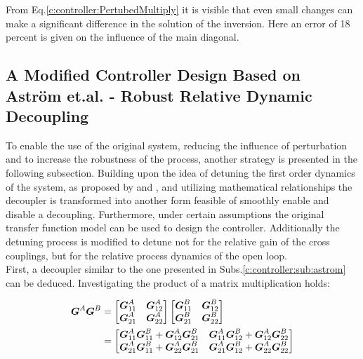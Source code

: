 From Eq.\ref{c:controller:PertubedMultiply} it is visible that even small changes can make a significant difference in the solution of the inversion. Here an error of 18 percent is given on the influence of the main diagonal.\\



\subsection{A Modified Controller Design Based on Astr\"om et.al. - Robust Relative Dynamic Decoupling}
\label{c:controller:sub:modified}

To enable the use of the original system, reducing the influence of perturbation and to increase the robustness of the process, another strategy is presented in the following subsection. Building upon the idea of detuning the first order dynamics of the system, as proposed by \cite{Astrom2001a} and \cite{Astrom2006}, and utilizing mathematical relationships the decoupler is transformed into another form feasible of smoothly enable and disable a decoupling. Furthermore, under certain assumptions the original transfer function model can be used to design the controller. Additionally the detuning process is modified to detune not for the relative gain of the cross couplings, but for the relative process dynamics of the open loop.\\

First, a decoupler similar to the one presented in Subs.\ref{c:controller:sub:astrom} can be deduced. Investigating the product of a matrix multiplication holds: 

\begin{align}
\begin{split}
\mbox{\boldmath$G$}^{A} \mbox{\boldmath$G$}^{B} &= 
\begin{bmatrix}
\mbox{\boldmath$G$}_{11}^{A} & \mbox{\boldmath$G$}_{12}^{A} \\
\mbox{\boldmath$G$}_{21}^{A} & \mbox{\boldmath$G$}_{22}^{A} 
\end{bmatrix}
\begin{bmatrix}
\mbox{\boldmath$G$}_{11}^{B} & \mbox{\boldmath$G$}_{12}^{B} \\
\mbox{\boldmath$G$}_{21}^{B} & \mbox{\boldmath$G$}_{22}^{B} 
\end{bmatrix}\\
&= \begin{bmatrix}
\mbox{\boldmath$G$}_{11}^{A}\mbox{\boldmath$G$}_{11}^{B} + \mbox{\boldmath$G$}_{12}^{A}\mbox{\boldmath$G$}_{21}^{B} & \mbox{\boldmath$G$}_{11}^{A}\mbox{\boldmath$G$}_{12}^{B} + \mbox{\boldmath$G$}_{12}^{A}\mbox{\boldmath$G$}_{22}^{B} \\
\mbox{\boldmath$G$}_{21}^{A}\mbox{\boldmath$G$}_{11}^{B} + \mbox{\boldmath$G$}_{22}^{A}\mbox{\boldmath$G$}_{21}^{B} &
\mbox{\boldmath$G$}_{21}^{A}\mbox{\boldmath$G$}_{12}^{B} + \mbox{\boldmath$G$}_{22}^{A}\mbox{\boldmath$G$}_{22}^{B}
\end{bmatrix}
\end{split}
\label{c:controller:e:matrixmult}
\end{align}

